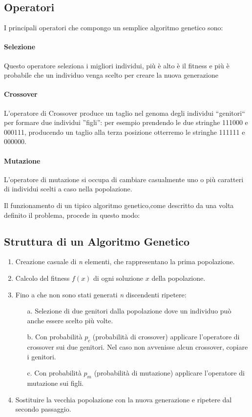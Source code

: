 \documentclass[12pt,a4paper]{report}
\begin{document}
\subsection{Operatori}

I principali operatori che compongo un semplice algoritmo genetico sono\cite{genetic-algorithm-mitchell}:

\paragraph{Selezione} Questo operatore seleziona i migliori individui, più è alto è il fitness e più è probabile che un individuo venga scelto per creare la nuova generazione

\paragraph{Crossover} L'operatore di Crossover produce un taglio nel genoma degli individui ``genitori`` per formare due individui ''figli'': per esempio prendendo le due stringhe 111000 e 000111, producendo un taglio alla terza posizione otterremo le stringhe  111111 e 000000.

\paragraph{Mutazione} L'operatore di mutazione si occupa di cambiare casualmente uno o più caratteri di individui scelti a caso nella popolazione.

Il funzionamento di un tipico algoritmo genetico,come descritto da \cite{genetic-algorithm-mitchell} una volta definito il problema,  procede in questo modo:

\subsection{Struttura di un Algoritmo Genetico}

\begin{enumerate}
 \item Creazione casuale di \textit{n} elementi, che rappresentano la prima popolazione. 
 \item Calcolo del fitness $f(x)$ di ogni soluzione $x$ della popolazione.
 \item Fino a che non sono stati generati \textit{n} discendenti ripetere:
 \begin{enumerate}
  \item[a.] Selezione di due genitori dalla popolazione dove un individuo può anche essere scelto più volte.
  \item[b.] Con probabilità $p_{c}$ (probabilità di crossover) applicare l'operatore di crossover sui due genitori. Nel caso non avvenisse alcun crossover, copiare i genitori.
  \item[c.] Con probabilità $p_{m}$ (probabilità di mutazione) applicare l'operatore di mutazione sui figli.
 \end{enumerate}
 \item Sostituire la vecchia popolazione con la nuova generazione e ripetere dal secondo passaggio.
\end{enumerate}
\end{document}
